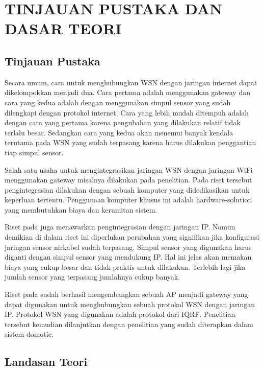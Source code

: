 
\chapter{TINJAUAN PUSTAKA DAN DASAR TEORI}                

\section{Tinjauan Pustaka}
  Secara umum, cara untuk menghubungkan WSN dengan jaringan internet dapat dikelompokkan menjadi dua. Cara pertama adalah menggunakan gateway dan cara yang kedua adalah dengan menggunakan simpul sensor yang sudah dilengkapi dengan protokol internet. Cara yang lebih mudah ditempuh adalah dengan cara yang pertama karena pengubahan yang dilakukan relatif tidak terlalu besar. Sedangkan cara yang kedua akan menemui banyak kendala terutama pada WSN yang sudah terpasang karena harus dilakukan penggantian tiap simpul sensor.

  Salah satu usaha untuk mengintegrasikan jaringan WSN dengan jaringan WiFi menggunakan gateway misalnya dilakukan pada penelitian. Pada riset tersebut pengintegrasian dilakukan dengan sebuah komputer yang didedikasikan untuk keperluan tertentu. Penggunaan komputer khusus ini adalah hardware-solution yang membutuhkan biaya dan kerumitan sistem.

  Riset pada juga menawarkan pengintegrasian dengan jaringan IP. Namun demikian di dalam riset ini diperlukan perubahan yang signifikan jika konfigurasi jaringan sensor nirkabel sudah terpasang. Simpul sensor yang digunakan harus diganti dengan simpul sensor yang mendukung IP. Hal ini jelas akan memakan biaya yang cukup besar dan tidak praktis untuk dilakukan. Terlebih lagi jika jumlah sensor yang terpasang jumlahnya cukup banyak.

  Riset pada sudah berhasil mengembangkan sebuah AP menjadi gateway yang dapat digunakan untuk menghubungkan sebuah protokol WSN dengan jaringan IP. Protokol WSN yang digunakan adalah protokol dari IQRF. Penelitian tersebut kemudian dilanjutkan dengan penelitian yang sudah diterapkan dalam sistem domotic.

\section{Landasan Teori}
